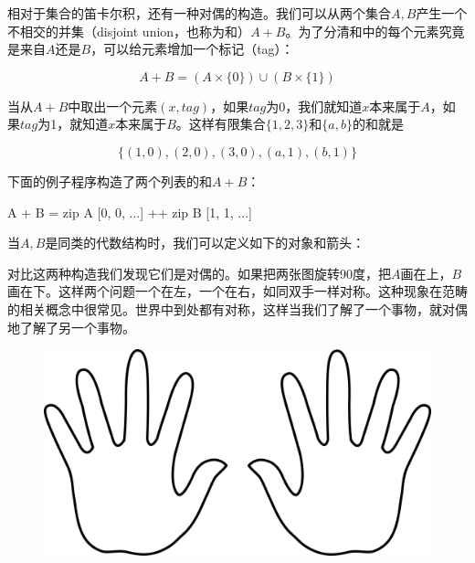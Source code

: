 \documentclass[b5paper]{ctexart}
\begin{document}
相对于集合的笛卡尔积，还有一种对偶的构造。我们可以从两个集合$A, B$产生一个不相交的并集（disjoint union，也称为和）$A + B$。为了分清和中的每个元素究竟是来自$A$还是$B$，可以给元素增加一个标记（tag）：

\[
A + B = (A \times \{0\}) \cup (B \times \{1\})
\]

当从$A+B$中取出一个元素$(x, tag)$，如果$tag$为0，我们就知道$x$本来属于$A$，如果$tag$为1，就知道$x$本来属于$B$。这样有限集合$\{1, 2, 3\}$和$\{a, b\}$的和就是

\[
\{(1, 0), (2, 0), (3, 0), (a, 1), (b, 1)\}
\]

下面的例子程序构造了两个列表的和$A + B$：

\begin{Haskell}[frame=single]
A + B = zip A [0, 0, ...] ++ zip B [1, 1, ...]
\end{Haskell}

当$A, B$是同类的代数结构时，我们可以定义如下的对象和箭头：

\begin{center}
\end{center}

对比这两种构造我们发现它们是对偶的。如果把两张图旋转90度，把$A$画在上，$B$画在下。这样两个问题一个在左，一个在右，如同双手一样对称。这种现象在范畴的相关概念中很常见。世界中到处都有对称，这样当我们了解了一个事物，就对偶地了解了另一个事物。

\begin{figure}[htbp]
 \centering
 \includegraphics[scale=0.06]{img/hands}
 \captionsetup{labelformat=empty}
 \caption{}
 \label{fig:hands}
\end{figure}
\end{document}
